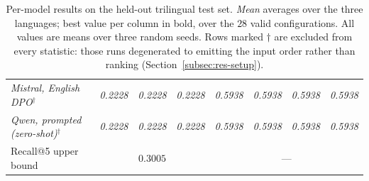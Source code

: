 \begin{table}[H]
\begin{tabular}{l rrr rrr r}
\quad \itshape Mistral, English DPO$^{\dagger}$ & \itshape 0.2228 & \itshape 0.2228 & \itshape 0.2228 & \itshape 0.5938 & \itshape 0.5938 & \itshape 0.5938 & \itshape 0.5938 \\
\quad \itshape Qwen, prompted (zero-shot)$^{\dagger}$ & \itshape 0.2228 & \itshape 0.2228 & \itshape 0.2228 & \itshape 0.5938 & \itshape 0.5938 & \itshape 0.5938 & \itshape 0.5938 \\
\midrule
Recall@5 upper bound & \multicolumn{3}{c}{$0.3005$} & \multicolumn{4}{c}{---} \\
\bottomrule
\end{tabular}
\caption{Per-model results on the held-out trilingual test set. \emph{Mean} averages over the three
languages; best value per column in bold, over the $28$ valid configurations. All values are means over
three random seeds. Rows marked $\dagger$ are excluded from every statistic: those runs degenerated to
emitting the input order rather than ranking (Section~\ref{subsec:res-setup}).}
\label{tab:results-main}
\end{table}
